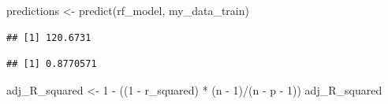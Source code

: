 \documentclass[
]{article}
\newenvironment{Shaded}{\begin{snugshade}}{\end{snugshade}}
\newcommand{\DecValTok}[1]{\textcolor[rgb]{0.00,0.00,0.81}{#1}}
\newcommand{\FunctionTok}[1]{\textcolor[rgb]{0.00,0.00,0.00}{#1}}
\newcommand{\NormalTok}[1]{#1}
\newcommand{\OtherTok}[1]{\textcolor[rgb]{0.56,0.35,0.01}{#1}}
\newcommand{\SpecialCharTok}[1]{\textcolor[rgb]{0.00,0.00,0.00}{#1}}
\begin{document}
\begin{Shaded}
\begin{Highlighting}[]
\NormalTok{predictions }\OtherTok{\textless{}{-}} \FunctionTok{predict}\NormalTok{(rf\_model, my\_data\_train)}
\end{Highlighting}
\end{Shaded}

\begin{Shaded}
\end{Shaded}

\begin{verbatim}
## [1] 120.6731
\end{verbatim}

\begin{Shaded}
\end{Shaded}

\begin{verbatim}
## [1] 0.8770571
\end{verbatim}

\begin{Shaded}
\begin{Highlighting}[]
\NormalTok{adj\_R\_squared }\OtherTok{\textless{}{-}} \DecValTok{1} \SpecialCharTok{{-}}\NormalTok{ ((}\DecValTok{1} \SpecialCharTok{{-}}\NormalTok{ r\_squared) }\SpecialCharTok{*}\NormalTok{ (n }\SpecialCharTok{{-}} \DecValTok{1}\NormalTok{)}\SpecialCharTok{/}\NormalTok{(n }\SpecialCharTok{{-}}\NormalTok{ p }\SpecialCharTok{{-}} \DecValTok{1}\NormalTok{))}
\NormalTok{adj\_R\_squared}
\end{Highlighting}
\end{Shaded}
\end{document}
